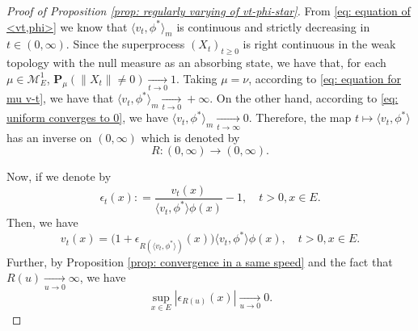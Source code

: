 \documentclass[12pt, a4paper]{amsart}
\theoremstyle{definition}
\numberwithin{equation}{section}
\begin{document}
\begin{proof}[Proof of Proposition \ref{prop: regularly varying of vt-phi-star}]
	
	From \eqref{eq: equation of <vt,phi>} we know that $\langle v_t,\phi^* \rangle_m$ is continuous and strictly decreasing in $t \in (0,\infty)$.
	Since the superprocess $(X_t)_{t\geq 0}$ is right continuous in the weak topology with the null measure as an absorbing state, we have that, for each $\mu \in \mathcal M_E^1$, 
	$\mathbf P_\mu (\|X_t\| \neq 0) \xrightarrow[t\to 0]{} 1$.
	Taking $\mu = \nu$, according to \eqref{eq: equation for mu v-t}, we have that $\langle v_{t}, \phi^*\rangle_m \xrightarrow[t\to 0]{} +\infty$.
	On the other hand, according to \eqref{eq: uniform converges to 0}, we have $\langle v_{t}, \phi^*\rangle_m \xrightarrow[t\to \infty]{} 0$.
	Therefore, the map $t\mapsto \langle v_t,\phi^*  \rangle$ has an inverse on $(0,\infty)$ which is denoted by
\begin{equation}
	R: (0,\infty) \to (0,\infty).
\end{equation}
	
	Now, if we denote by
\begin{equation}
	\epsilon_{t}(x)
	: = \frac{v_t(x)}{\langle v_t, \phi^*\rangle \phi(x)} - 1,
	\quad t>0, x\in E.
\end{equation}
	Then, we have
\begin{equation}\label{eq: change variable using inverse}
	v_t(x)
	= \big(1+ \epsilon_{R(\langle v_t,\phi^* \rangle)}(x) \big )\langle v_t,\phi^* \rangle \phi(x),
	\quad t>0, x\in E.
\end{equation}
	Further, by Proposition \ref{prop: convergence in a same speed} and 
	the fact that $R(u)\xrightarrow[u\to 0]{} \infty$, we have
\begin{equation}\label{eq: epsilon R converges to 0}
	\sup_{x\in E}|\epsilon_{R(u)}(x)|
	\xrightarrow[u\to 0]{} 0.
\end{equation}


\end{proof}
\end{document}
